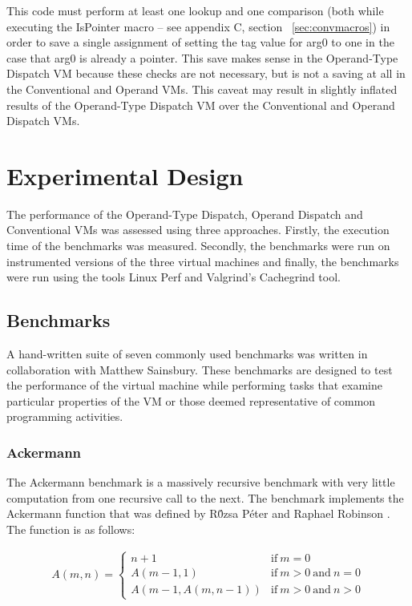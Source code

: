 \documentclass[english,a4paper,12pt]{report}
\begin{document}
This code must perform at least one lookup and one comparison (both
while executing the IsPointer macro -- see appendix C, section ~\ref{sec:convmacros}) in
order to save a single assignment of setting the tag value for arg0 to
one in the case that arg0 is already a pointer. This save makes sense
in the Operand-Type Dispatch VM because these checks are not
necessary, but is not a saving at all in the Conventional and Operand
VMs. This caveat may result in slightly inflated results of the
Operand-Type Dispatch VM over the Conventional and Operand Dispatch
VMs.

\chapter{Experimental Design}

The performance of the Operand-Type Dispatch, Operand Dispatch and
Conventional VMs was assessed using three approaches. Firstly, the
execution time of the benchmarks was measured. Secondly, the
benchmarks were run on instrumented versions of the three virtual
machines and finally, the benchmarks were run using the tools Linux
Perf and Valgrind's Cachegrind \cite{cachegrind} tool.

\section{Benchmarks}

A hand-written suite of seven commonly used benchmarks was written in
collaboration with Matthew Sainsbury. These benchmarks are designed to
test the performance of the virtual machine while performing tasks
that examine particular properties of the VM or those deemed
representative of common programming activities.

\subsection{Ackermann}

The Ackermann benchmark is a massively recursive benchmark with very
little computation from one recursive call to the next. The benchmark
implements the Ackermann function that was defined by R\'{0}zsa P\'{e}ter and
Raphael Robinson \cite{robinson1948}. The function is as follows:

\begin{align*}
\label{eq:ackermann}
A (m, n) = \left\{
\begin{array}{ll}
n + 1          &  \mathrm{if}\ m = 0 \\
A (m - 1, 1)   &  \mathrm{if }\ m > 0 \mathrm{\ and\ } n = 0 \\
A (m - 1, A (m, n - 1))   & \mathrm{if}\ m > 0 \mathrm{\  and\  } n > 0 
\end{array}
\right.
\end{align*}
\end{document}
